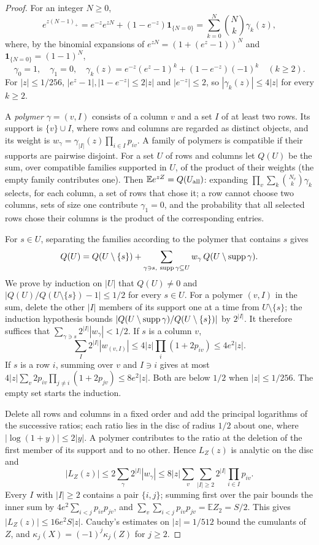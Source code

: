 \documentclass[11pt,a4paper]{article}
\theoremstyle{definition}\newtheorem{remark}[theorem]{Remark}\newtheorem{conjecture}{Conjecture}
\newcommand{\E}{\mathbb E}\newcommand{\Prb}{\mathbb P}\newcommand{\Var}{\operatorname{Var}}
\newcommand{\ind}{\mathbf 1}\newcommand{\eps}{\varepsilon}\newcommand{\dist}{d_{\rm TV}}
\begin{document}
\begin{proof}
For an integer $N\ge0$,
\[
 e^{z(N-1)_+}=e^{-z}e^{zN}+(1-e^{-z})\ind_{\{N=0\}}=\sum_{k=0}^N\binom Nk\gamma_k(z),
\]
where, by the binomial expansions of $e^{zN}=(1+(e^z-1))^N$ and $\ind_{\{N=0\}}=(1-1)^N$,
\[
\gamma_0=1,\quad \gamma_1=0,\quad \gamma_k(z)=e^{-z}(e^z-1)^k+(1-e^{-z})(-1)^k\quad(k\ge2).
\]
For $|z|\le1/256$, $|e^z-1|,|1-e^{-z}|\le2|z|$ and $|e^{-z}|\le2$, so $|\gamma_k(z)|\le4|z|$ for every $k\ge2$.

A \emph{polymer} $\gamma=(v,I)$ consists of a column $v$ and a set $I$ of at least two rows. Its support is $\{v\}\cup I$, where rows and columns are regarded as distinct objects, and its weight is $w_\gamma=\gamma_{|I|}(z)\prod_{i\in I}p_{iv}$. A family of polymers is compatible if their supports are pairwise disjoint. For a set $U$ of rows and columns let $Q(U)$ be the sum, over compatible families supported in $U$, of the product of their weights (the empty family contributes one). Then $\E e^{zZ}=Q(U_{\rm all})$: expanding $\prod_v\sum_k\binom{N_v}{k}\gamma_k$ selects, for each column, a set of rows that chose it; a row cannot choose two columns, sets of size one contribute $\gamma_1=0$, and the probability that all selected rows chose their columns is the product of the corresponding entries.

For $s\in U$, separating the families according to the polymer that contains $s$ gives
\[
 Q(U)=Q(U\setminus\{s\})+\sum_{\gamma\ni s,\ {\rm supp}\,\gamma\subseteq U}w_\gamma\, Q(U\setminus{\rm supp}\,\gamma).
\]
We prove by induction on $|U|$ that $Q(U)\ne0$ and $|Q(U)/Q(U\setminus\{s\})-1|\le1/2$ for every $s\in U$. For a polymer $(v,I)$ in the sum, delete the other $|I|$ members of its support one at a time from $U\setminus\{s\}$; the induction hypothesis bounds $|Q(U\setminus{\rm supp}\,\gamma)/Q(U\setminus\{s\})|$ by $2^{|I|}$. It therefore suffices that $\sum_{\gamma\ni s}2^{|I|}|w_\gamma|<1/2$. If $s$ is a column $v$,
\[
\sum_I 2^{|I|}|w_{(v,I)}|\le4|z|\prod_i(1+2p_{iv})\le4e^2|z|.
\]
If $s$ is a row $i$, summing over $v$ and $I\ni i$ gives at most $4|z|\sum_v2p_{iv}\prod_{j\ne i}(1+2p_{jv})\le8e^2|z|$. Both are below $1/2$ when $|z|\le1/256$. The empty set starts the induction.

Delete all rows and columns in a fixed order and add the principal logarithms of the successive ratios; each ratio lies in the disc of radius $1/2$ about one, where $|\log(1+y)|\le2|y|$. A polymer contributes to the ratio at the deletion of the first member of its support and to no other. Hence $L_Z(z)$ is analytic on the disc and
\[
 |L_Z(z)|\le 2\sum_\gamma 2^{|I|}|w_\gamma|\le 8|z|\sum_v\sum_{|I|\ge2}2^{|I|}\prod_{i\in I}p_{iv}.
\]
Every $I$ with $|I|\ge2$ contains a pair $\{i,j\}$; summing first over the pair bounds the inner sum by $4e^2\sum_{i<j}p_{iv}p_{jv}$, and $\sum_v\sum_{i<j}p_{iv}p_{jv}=\E Z_2=S/2$. This gives $|L_Z(z)|\le16e^2S|z|$. Cauchy's estimates on $|z|=1/512$ bound the cumulants of $Z$, and $\kappa_j(X)=(-1)^j\kappa_j(Z)$ for $j\ge2$.
\end{proof}
\end{document}
